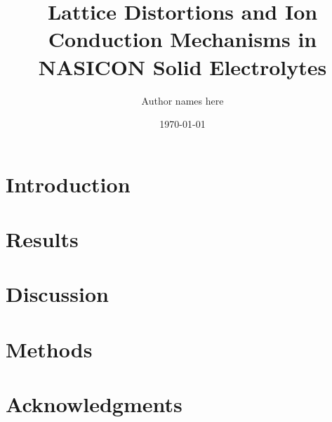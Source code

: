 \documentclass[12pt]{article}
\title{Lattice Distortions and Ion Conduction Mechanisms in NASICON Solid Electrolytes}
\author{Author names here}
\date{\today}
\begin{document}
\maketitle

\begin{abstract}
\end{abstract}

\section{Introduction}


\section{Results}

\section{Discussion}

\section{Methods}

\section{Acknowledgments}

\appendix



\end{document}

